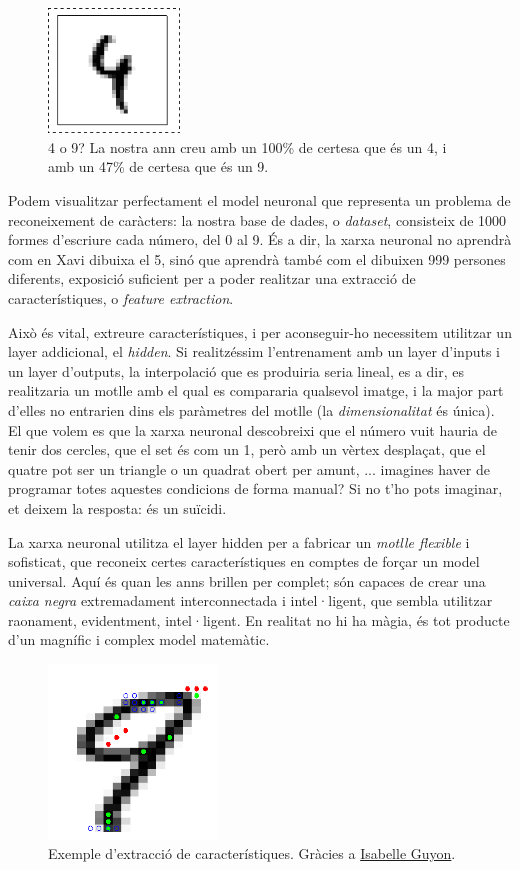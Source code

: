 \begin{figure}[ht!]
\centering
\includegraphics[width=35mm]{data/confusing_2.png}
\caption{4 o 9? La nostra \ac{ann} creu amb un 100\% de certesa que és un 4, i amb un 47\% de certesa que és un 9.}
\label{simple_ann}
\end{figure}

Podem visualitzar perfectament el model neuronal que representa un problema de reconeixement de caràcters: la nostra
base de dades, o \emph{dataset}, consisteix de 1000 formes d'escriure cada número, del 0 al 9. És a dir, la xarxa neuronal
no aprendrà com en Xavi dibuixa el 5, sinó que aprendrà també com el dibuixen 999 persones diferents, exposició suficient per
a poder realitzar una extracció de característiques, o \emph{feature extraction}.

Això és vital, extreure característiques, i per aconseguir-ho necessitem utilitzar un layer addicional, el \emph{hidden}. 
Si realitzéssim l'entrenament amb un layer d'inputs i un layer d'outputs, la interpolació que es produiria seria lineal,
es a dir, es realitzaria un motlle amb el qual es compararia qualsevol imatge, i la major part d'elles no entrarien dins
els paràmetres del motlle (la \emph{dimensionalitat} és única). El que volem es que la xarxa neuronal descobreixi que el número
vuit hauria de tenir dos cercles, que el set és com un 1, però amb un vèrtex desplaçat, que el quatre pot ser un triangle o un
quadrat obert per amunt, ... imagines haver de programar totes aquestes condicions de forma manual? Si no t'ho pots imaginar, 
et deixem la resposta: és un suïcidi.

La xarxa neuronal utilitza el layer hidden per a fabricar un \emph{motlle flexible} i sofisticat, que reconeix certes característiques
en comptes de forçar un model universal. Aquí és quan les \ac{ann}s brillen per complet; són capaces de crear una \emph{caixa negra}
extremadament interconnectada i intel·ligent, que sembla utilitzar raonament, evidentment, intel·ligent. En realitat no hi ha màgia, 
és tot producte d'un magnífic i complex model matemàtic.

\begin{figure}[ht!]
\centering
\includegraphics[width=45mm]{data/extraction-0.png}
\caption{Exemple d'extracció de característiques. Gràcies a \href{http://clopinet.com/isabelle/Projects/ETH/}{Isabelle Guyon}.}
\label{simple_ann}
\end{figure}

